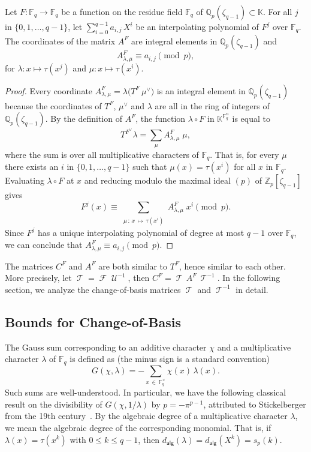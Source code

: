 \documentclass[12pt]{article}
\newcommand{\F}{\mathbb{F}}
\newcommand{\QQ}{\mathbb{Q}}
\newcommand{\ZZ}{\mathbb{Z}}
\newcommand{\K}{\mathbb{K}}
\newcommand{\dual}{\vee}
\DeclareMathOperator{\FT}{\mathscr{F}}
\DeclareMathOperator{\UT}{\mathscr{U}}
\DeclareMathOperator{\TT}{\mathscr{T}}
\newcommand{\adeg}[1]{d_{\mathsf{alg}}(#1)}
\begin{document}
\begin{theorem} \label{thm:reduction}
Let $F : \F_q \to \F_q$ be a function on the residue field $\F_q$ of $\QQ_p(\zeta_{q - 1}) \subset \K$. For all $j$ in $\{0, 1, \ldots, q - 1\}$, let $\sum_{i = 0}^{q - 1} a_{i, j}\, X^i$ be an interpolating polynomial of $F^j$ over $\F_q$.
The coordinates of the matrix $A^F$ are integral elements in $\QQ_p(\zeta_{q - 1})$ and
\begin{equation*}
A^F_{\lambda, \mu} \equiv a_{i, j} \pmod{p},
\end{equation*}
for $\lambda : x \mapsto \tau(x^j)$ and $\mu : x \mapsto \tau(x^i)$.
\end{theorem}
\begin{proof}
Every coordinate $A^F_{\lambda, \mu} = \lambda\big(T^F \,\mu^\dual\big)$ is an integral element in $\QQ_p(\zeta_{q - 1})$ because the coordinates of $T^F$, $\mu^\dual$ and $\lambda$ are all  in the ring of integers of $\QQ_p(\zeta_{q - 1})$. By the definition of $A^F$, the function $\lambda \circ F$ in $\K^{\F_q^n}$ is equal to
\begin{equation*}
T^{F^\dual} \lambda = \sum_{\mu} A^F_{\lambda, \mu} \; \mu,
\end{equation*}
where the sum is over all multiplicative characters of $\F_q$. That is, for every $\mu$ there exists an $i$ in $\{0, 1, \ldots, q - 1\}$ such that $\mu(x) = \tau(x^i)$ for all $x$ in $\F_q$. Evaluating $\lambda \circ F$ at $x$ and reducing modulo the maximal ideal $(p)$ of $\ZZ_p[\zeta_{q - 1}]$ gives
\begin{equation*}
F^j(x) \equiv \sum_{\substack{\mu\, :\, x \,\mapsto\, \tau(x^i)}} A^F_{\lambda, \mu}\;x^i \pmod{p}.
\end{equation*}
Since $F^j$ has a unique interpolating polynomial of degree at most $q - 1$ over $\F_q$, we can conclude that $A^F_{\lambda, \mu} \equiv a_{i, j} \pmod{p}$.
\end{proof}

The matrices $C^F$ and $A^F$ are both similar to $T^F$, hence similar to each other. More precisely, let $\TT = \FT \UT^{-1}$, then $C^F = \TT\,A^F\,\TT^{-1}$. In the following section, we analyze the change-of-basis matrices $\TT$ and $\TT^{-1}$ in detail.

\subsection{Bounds for Change-of-Basis}
The Gauss sum corresponding to an additive character $\chi$ and a multiplicative character $\lambda$ of $\F_q$ is defined as (the minus sign is a standard convention)
\begin{equation*}
G(\chi, \lambda) = -\sum_{x \,\in\, \F_q^\times} \chi(x)\,\lambda(x).
\end{equation*}
Such sums are well-understood. In particular, we have the following classical result on the divisibility of $G(\chi, 1/\lambda)$ by $p = -\pi^{p - 1}$, attributed to Stickelberger from the 19th century~\cite{stickelberger}.
By the algebraic degree of a multiplicative character $\lambda$, we mean the algebraic degree of the corresponding monomial. That is, if $\lambda(x) = \tau(x^k)$ with $0 \le k \le q - 1$, then $\adeg{\lambda} = \adeg{X^k} = s_p(k)$.
\end{document}
